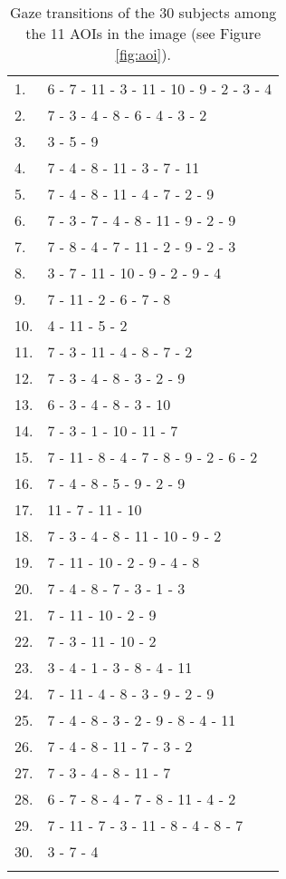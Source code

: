 \begin{table}[H]
  \small
  \begin{tabular}{ll}
    1. & 6 - 7 - 11 - 3 - 11 - 10 - 9 - 2 - 3 - 4\\
    2. & 7 - 3 - 4 - 8 - 6 - 4 - 3 - 2\\
    3. & 3 - 5 - 9\\
    4. & 7 - 4 - 8 - 11 - 3 - 7 - 11\\
    5. & 7 - 4 - 8 - 11 - 4 - 7 - 2 - 9\\
    6. & 7 - 3 - 7 - 4 - 8 - 11 - 9 - 2 - 9\\
    7. & 7 - 8 - 4 - 7 - 11 - 2 - 9 - 2 - 3\\
    8. & 3 - 7 - 11 - 10 - 9 - 2 - 9 - 4\\
    9. & 7 - 11 - 2 - 6 - 7 - 8\\
    10.& 4 - 11 - 5 - 2\\
    11.& 7 - 3 - 11 - 4 - 8 - 7 - 2\\
    12.& 7 - 3 - 4 - 8 - 3 - 2 - 9\\
    13.& 6 - 3 - 4 - 8 - 3 - 10\\
    14.& 7 - 3 - 1 - 10 - 11 - 7\\
    15.& 7 - 11 - 8 - 4 - 7 - 8 - 9 - 2 - 6 - 2\\
    16.& 7 - 4 - 8 - 5 - 9 - 2 - 9\\
    17.& 11 - 7 - 11 - 10\\
    18.& 7 - 3 - 4 - 8 - 11 - 10 - 9 - 2\\
    19.& 7 - 11 - 10 - 2 - 9 - 4 - 8\\
    20.& 7 - 4 - 8 - 7 - 3 - 1 - 3\\
    21.& 7 - 11 - 10 - 2 - 9\\
    22.& 7 - 3 - 11 - 10 - 2\\
    23.& 3 - 4 - 1 - 3 - 8 - 4 - 11\\
    24.& 7 - 11 - 4 - 8 - 3 - 9 - 2 - 9\\
    25.& 7 - 4 - 8 - 3 - 2 - 9 - 8 - 4 - 11\\
    26.& 7 - 4 - 8 - 11 - 7 - 3 - 2 \\
    27.& 7 - 3 - 4 - 8 - 11 - 7\\
    28.& 6 - 7 - 8 - 4 - 7 - 8 - 11 - 4 - 2\\
    29.& 7 - 11 - 7 - 3 - 11 - 8 - 4 - 8 - 7\\
    30.& 3 - 7 - 4\\
    \\
  \end{tabular}
  \caption{Gaze transitions of the 30 subjects among the 11 AOIs in the image (see Figure \ref{fig:aoi}).}
  \label{tab:seq}
\end{table}

